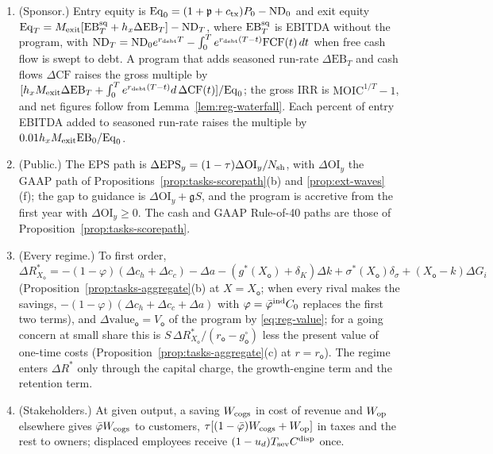 \begin{proposition}\label{prop:reg-metrics}
\begin{enumerate}
\item[(a)] (Sponsor.) Entry equity is $\mathrm{Eq}_0=(1+\mathfrak p+c_{\rm tx})P_0-\mathrm{ND}_0$ and exit equity $\mathrm{Eq}_T=M_{\rm exit}[\mathrm{EB}^{\rm sq}_T+h_x\Delta\mathrm{EB}_T]-\mathrm{ND}_T$, where $\mathrm{EB}^{\rm sq}_T$ is EBITDA without the program, with $\mathrm{ND}_T=\mathrm{ND}_0e^{r_{\rm debt}T}-\int_0^Te^{r_{\rm debt}(T-t)}\mathrm{FCF}(t)\,dt$ when free cash flow is swept to debt. A program that adds seasoned run-rate $\Delta\mathrm{EB}_T$ and cash flows $\Delta\mathrm{CF}$ raises the gross multiple by $[h_xM_{\rm exit}\Delta\mathrm{EB}_T+\int_0^Te^{r_{\rm debt}(T-t)}d\,\Delta\mathrm{CF}(t)]/\mathrm{Eq}_0$; the gross IRR is $\mathrm{MOIC}^{1/T}-1$, and net figures follow from Lemma~\ref{lem:reg-waterfall}. Each percent of entry EBITDA added to seasoned run-rate raises the multiple by $0.01h_xM_{\rm exit}\mathrm{EB}_0/\mathrm{Eq}_0$.
\item[(b)] (Public.) The EPS path is $\Delta\mathrm{EPS}_y=(1-\tau)\Delta\mathrm{OI}_y/N_{\rm sh}$, with $\Delta\mathrm{OI}_y$ the GAAP path of Propositions~\ref{prop:tasks-scorepath}(b) and \ref{prop:ext-waves}(f); the gap to guidance is $\Delta\mathrm{OI}_y+\mathfrak gS$, and the program is accretive from the first year with $\Delta\mathrm{OI}_y\ge0$. The cash and GAAP Rule-of-40 paths are those of Proposition~\ref{prop:tasks-scorepath}.
\item[(c)] (Every regime.) To first order, $\Delta R^*_{X_{\mathsf o}}=-(1-\varphi)(\Delta c_h+\Delta c_c)-\Delta a-(g^*(X_{\mathsf o})+\delta_K)\Delta k+\sigma^*(X_{\mathsf o})\delta_\sigma+(X_{\mathsf o}-k)\Delta G_i$ (Proposition~\ref{prop:tasks-aggregate}(b) at $X=X_{\mathsf o}$; when every rival makes the savings, $-(1-\varphi)(\Delta c_h+\Delta c_c+\Delta a)$ with $\varphi=\bar\varphi^{\rm ind}C_0$ replaces the first two terms), and $\Delta\text{value}_{\mathsf o}=V_{\mathsf o}$ of the program by \eqref{eq:reg-value}; for a going concern at small share this is $S\,\Delta R^*_{X_{\mathsf o}}/(r_{\mathsf o}-g^\circ_{\mathsf o})$ less the present value of one-time costs (Proposition~\ref{prop:tasks-aggregate}(c) at $r=r_{\mathsf o}$). The regime enters $\Delta R^*$ only through the capital charge, the growth-engine term and the retention term.
\item[(d)] (Stakeholders.) At given output, a saving $W_{\rm cogs}$ in cost of revenue and $W_{\rm op}$ elsewhere gives $\bar\varphi W_{\rm cogs}$ to customers, $\tau[(1-\bar\varphi)W_{\rm cogs}+W_{\rm op}]$ in taxes and the rest to owners; displaced employees receive $(1-u_d)T_{\rm sev}C^{\rm disp}$ once.
\end{enumerate}
\end{proposition}

